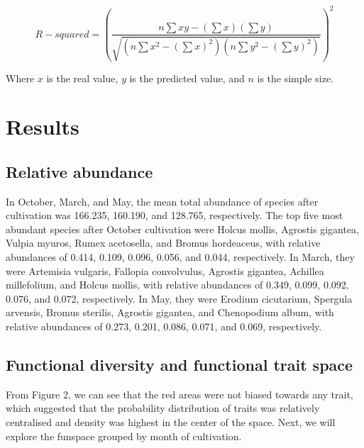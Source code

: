 \documentclass[a4paper, 11, margin=2cm]{article}
\begin{document}
      \begin{equation} R-squared = (\frac{n\sum x y - (\sum x) (\sum y)}{\sqrt{(n \sum x^2 - (\sum x)^2) (n \sum y^2 - (\sum y)^2)}})^2 \end{equation}

    Where $x$ is the real value, $y$ is the predicted value, and $n$ is the simple size.


    \section{Results}

    \subsection{Relative abundance}
    
    In October, March, and May, the mean total abundance of species after cultivation was 166.235, 160.190, and 128.765, respectively. The top five most abundant species after October cultivation were Holcus mollis, Agrostis gigantea, Vulpia myuros, Rumex acetosella, and Bromus hordeaceus, with relative abundances of 0.414, 0.109, 0.096, 0.056, and 0.044, respectively. In March, they were Artemisia vulgaris, Fallopia convolvulus, Agrostis gigantea, Achillea millefolium, and Holcus mollis, with relative abundances of 0.349, 0.099, 0.092, 0.076, and 0.072, respectively. In May, they were Erodium cicutarium, Spergula arvensis, Bromus sterilis, Agrostis gigantea, and Chenopodium album, with relative abundances of 0.273, 0.201, 0.086, 0.071, and 0.069, respectively.

    \subsection{Functional diversity and functional trait space}
      
    From Figure 2, we can see that the red areas were not biased towards any trait, which suggested that the probability distribution of traits was relatively centralised and density was highest in the center of the space. Next, we will explore the funspace grouped by month of cultivation.
\end{document}
